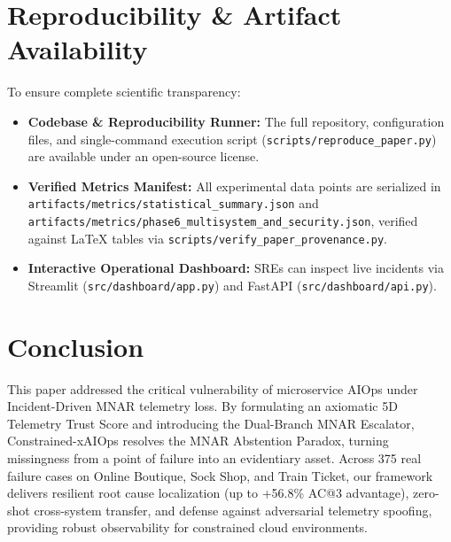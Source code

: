 \documentclass[conference]{IEEEtran}
\begin{document}
\section{Reproducibility \& Artifact Availability}
To ensure complete scientific transparency:
\begin{itemize}
    \item \textbf{Codebase \& Reproducibility Runner:} The full repository, configuration files, and single-command execution script (\texttt{scripts/reproduce\_paper.py}) are available under an open-source license.
    \item \textbf{Verified Metrics Manifest:} All experimental data points are serialized in \texttt{artifacts/metrics/statistical\_summary.json} and \texttt{artifacts/metrics/phase6\_multisystem\_and\_security.json}, verified against LaTeX tables via \texttt{scripts/verify\_paper\_provenance.py}.
    \item \textbf{Interactive Operational Dashboard:} SREs can inspect live incidents via Streamlit (\texttt{src/dashboard/app.py}) and FastAPI (\texttt{src/dashboard/api.py}).
\end{itemize}

\section{Conclusion}
This paper addressed the critical vulnerability of microservice AIOps under Incident-Driven MNAR telemetry loss. By formulating an axiomatic 5D Telemetry Trust Score and introducing the Dual-Branch MNAR Escalator, Constrained-xAIOps resolves the MNAR Abstention Paradox, turning missingness from a point of failure into an evidentiary asset. Across 375 real failure cases on Online Boutique, Sock Shop, and Train Ticket, our framework delivers resilient root cause localization (up to +56.8\% AC@3 advantage), zero-shot cross-system transfer, and defense against adversarial telemetry spoofing, providing robust observability for constrained cloud environments.



\end{document}
